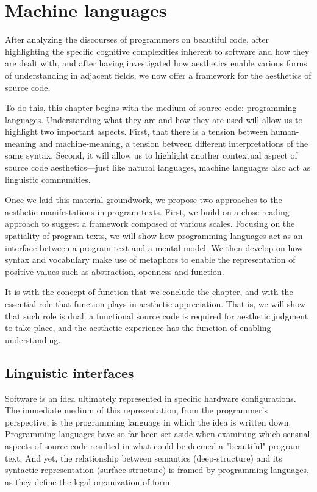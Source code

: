 \chapter{Machine languages}
\label{chap:programming}

After analyzing the discourses of programmers on beautiful code, after highlighting the specific cognitive complexities inherent to software and how they are dealt with, and after having investigated how aesthetics enable various forms of understanding in adjacent fields, we now offer a framework for the aesthetics of source code.

To do this, this chapter begins with the medium of source code: programming languages. Understanding what they are and how they are used will allow us to highlight two important aspects. First, that there is a tension between human-meaning and machine-meaning, a tension between different interpretations of the same syntax. Second, it will allow us to highlight another contextual aspect of source code aesthetics—just like natural languages, machine languages also act as linguistic communities.

Once we laid this material groundwork, we propose two approaches to the aesthetic manifestations in program texts. First, we build on a close-reading approach to suggest a framework composed of various scales.  Focusing on the spatiality of program texts, we will show how programming languages act as an interface between a program text and a mental model. We then develop on how syntax and vocabulary make use of metaphors to enable the representation of positive values such as abstraction, openness and function.

It is with the concept of function that we conclude the chapter, and with the essential role that function plays in aesthetic appreciation. That is, we will show that such role is dual: a functional source code is required for aesthetic judgment to take place, and the aesthetic experience has the function of enabling understanding.

\section{Linguistic interfaces}
\label{sec:linguistic-interfaces}

Software is an idea ultimately represented in specific hardware configurations. The immediate medium of this representation, from the programmer's perspective, is the programming language in which the idea is written down. Programming languages have so far been set aside when examining which sensual aspects of source code resulted in what could be deemed a "beautiful" program text. And yet, the relationship between semantics (deep-structure)  and its syntactic representation (surface-structure) is framed by programming languages, as they define the legal organization of form.

